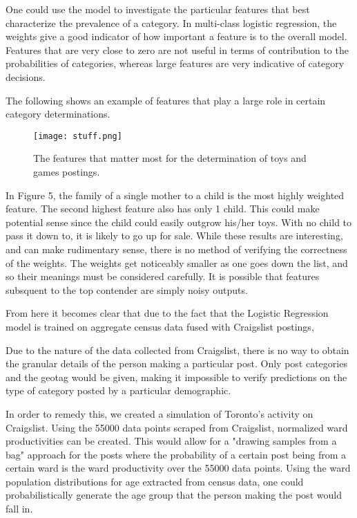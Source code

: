 \documentclass[12pt]{article}
\begin{document}
One could use the model to investigate the particular features that best characterize the prevalence of a category. In multi-class logistic regression, the weights give a good indicator of how important a feature is to the overall model. Features that are very close to zero are not useful in terms of contribution to the probabilities of categories, whereas large features are very indicative of category decisions. 

The following shows an example of features that play a large role in certain category determinations. 

\begin{figure}[h]
\centering
\texttt{[image: stuff.png]}
\caption{The features that matter most for the determination of toys and games postings.}
\end{figure}

In Figure 5, the family of a single mother to a child is the most highly weighted feature. The second highest feature also has only 1 child. This could make potential sense since the child could easily outgrow his/her toys. With no child to pass it down to, it is likely to go up for sale. 
While these results are interesting, and can make rudimentary sense, there is no method of verifying the correctness of the weights. The weights get noticeably smaller as one goes down the list, and so their meanings must be considered carefully. It is possible that features subsquent to the top contender are simply noisy outputs. 



From here it becomes clear that due to the fact that the Logistic Regression model is trained on aggregate census data fused with Craigslist postings, 



   Due to the nature of the data collected from Craigslist, there is no way to obtain the granular details of the person making a particular post. Only post categories and the geotag would be given, making it impossible to verify predictions on the type of category posted by a particular demographic. 

   In order to remedy this, we created a simulation of Toronto's activity on Craigslist. Using the 55000 data points scraped from Craigslist, normalized ward productivities can be created. This would allow for a "drawing samples from a bag" approach for the posts where the probability of a certain post being from a certain ward is the ward productivity over the 55000 data points. Using the ward population distributions for age extracted from census data, one could probabilistically generate the age group that the person making the post would fall in. 
\end{document}
